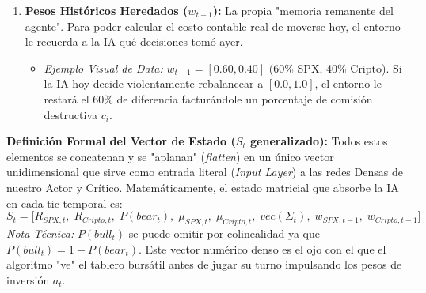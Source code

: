 \documentclass[11pt,a4paper]{article}
\begin{document}
\begin{enumerate}
    \item \textbf{Pesos Históricos Heredados ($w_{t-1}$):} La propia "memoria remanente del agente". Para poder calcular el costo contable real de moverse hoy, el entorno le recuerda a la IA qué decisiones tomó ayer.
    \begin{itemize}
        \item \textit{Ejemplo Visual de Data:} $w_{t-1} = [0.60, 0.40]$ (60\% SPX, 40\% Cripto). Si la IA hoy decide violentamente rebalancear a $[0.0, 1.0]$, el entorno le restará el $60\%$ de diferencia facturándole un porcentaje de comisión destructiva $c_i$.
    \end{itemize}
\end{enumerate}

\vspace{3mm}
\noindent \textbf{Definición Formal del Vector de Estado ($S_t$ generalizado):}
Todos estos elementos se concatenan y se "aplanan" (\textit{flatten}) en un único vector unidimensional que sirve como entrada literal (\textit{Input Layer}) a las redes Densas de nuestro Actor y Crítico. Matemáticamente, el estado matricial que absorbe la IA en cada tic temporal es:
\begin{equation}
    S_t = \Big[ R_{SPX, t},\; R_{Cripto, t},\; P(bear_t),\;  \mu_{SPX,t},\; \mu_{Cripto,t},\; vec(\Sigma_t),\; w_{SPX, t-1},\; w_{Cripto, t-1} \Big]
\end{equation}
\textit{Nota Técnica:} $P(bull_t)$ se puede omitir por colinealidad ya que $P(bull_t) = 1 - P(bear_t)$. Este vector numérico denso es el ojo con el que el algoritmo "ve" el tablero bursátil antes de jugar su turno impulsando los pesos de inversión $a_t$.
\end{document}
